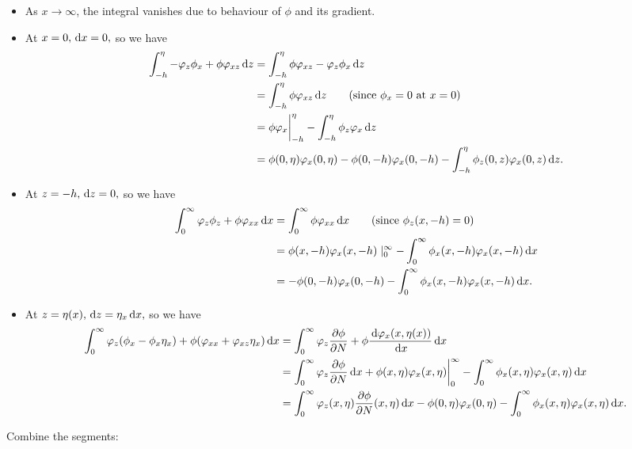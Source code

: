 \documentclass[10pt,reqno,oneside,a4paper]{article}
\begin{document}
\begin{itemize}
\item As $x \to \infty$, the integral vanishes due to behaviour of $\phi$ and its gradient. 
\item At $x = 0, \,\mathrm{d} x = 0,$ so we have 
\begin{align*}
\int_{-h}^{\eta} - \varphi_z \phi_x + \phi \varphi_{xz} \,\mathrm{d} z &= \int_{-h}^{\eta} \phi \varphi_{xz} - \varphi_z \phi_x  \,\mathrm{d} z \\
&= \int_{-h}^{\eta} \phi \varphi_{xz} \,\mathrm{d} z \qquad \text{(since $\phi_x = 0$ at $x = 0$)} \\
&= \phi \varphi_x \bigg|^{\eta}_{-h} - \int_{-h}^{\eta} \phi_{z} \varphi_{x} \,\mathrm{d} z \\
&= \phi(0, \eta) \varphi_x(0, \eta) - \phi(0, -h) \varphi_x(0, -h) - \int_{-h}^{\eta} \phi_{z}(0,z) \varphi_{x}(0,z) \,\mathrm{d} z. 
\end{align*} 
\item At $z = -h, \,\mathrm{d} z = 0,$ so we have 
\begin{align*}
\int^{\infty}_{0} \varphi_z \phi_z + \phi \varphi_{xx} \,\mathrm{d} x &= \int^{\infty}_{0} \phi \varphi_{xx} \,\mathrm{d} x \qquad \text{(since $\phi_{z}(x,-h) = 0$)}\\
&= \phi(x,-h) \varphi_{x}(x,-h) \mid^{\infty}_{0} - \int^{\infty}_{0} \phi_x(x,-h) \varphi_x(x,-h) \,\mathrm{d} x \\
&= - \phi(0,-h) \varphi_{x}(0,-h) - \int^{\infty}_{0} \phi_x(x,-h) \varphi_x(x,-h) \,\mathrm{d} x.
\end{align*}
\item At $z = \eta(x), \,\mathrm{d} z = \eta_x \,\mathrm{d} x,$ so we have
\begin{align*}
\int_{0}^{\infty} \varphi_z(\phi_x - \phi_x \eta_x) + \phi(\varphi_{xx}  + \varphi_{xz}\eta_x) \,\mathrm{d} x &= \int_{0}^{\infty} \varphi_z \frac{\partial \phi}{\partial N}+ \phi \frac{\,\mathrm{d} \varphi_x(x, \eta(x))}{\,\mathrm{d} x} \,\mathrm{d} x \\
&= \int_{0}^{\infty} \varphi_z\frac{\partial \phi}{\partial N}\,\mathrm{d} x + \phi(x, \eta) \varphi_x(x, \eta) \bigg|^{\infty}_{0} - \int^{\infty}_{0}\phi_x(x, \eta)  \varphi_x(x, \eta) \,\mathrm{d} x \\
&= \int_{0}^{\infty} \varphi_z(x, \eta)\frac{\partial \phi}{\partial N}(x, \eta)\,\mathrm{d} x - \phi(0, \eta) \varphi_x(0, \eta) - \int^{\infty}_{0}\phi_x(x, \eta)  \varphi_x(x, \eta) \,\mathrm{d} x.
\end{align*}
 \end{itemize}
Combine the segments:
\end{document}
